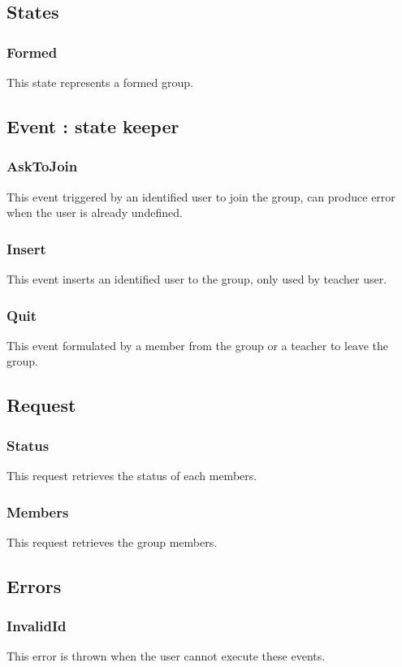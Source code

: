 	\subsection{States}
		\subsubsection{Formed}
			This state represents a formed group.
	\subsection{Event : state keeper}
		\subsubsection{AskToJoin}
			This event triggered by an identified user to join the group, can produce error when the user is already undefined.
		\subsubsection{Insert}
			This event inserts an identified user to the group, only used by teacher user.
		\subsubsection{Quit}
			This event formulated by a member from the group or a teacher to leave the group.
	\subsection{Request}
		\subsubsection{Status}
			This request retrieves the status of each members.
		\subsubsection{Members}
			This request retrieves the group members.
	\subsection{Errors}
		\subsubsection{InvalidId}
			This error is thrown when the user cannot execute these events.
\newpage
